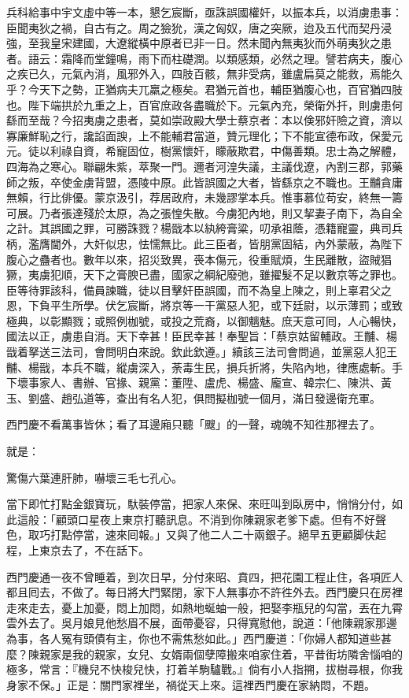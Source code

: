 兵科給事中宇文虛中等一本，懇乞宸斷，亟誅誤國權奸，以振本兵，以消虜患事：臣聞夷狄之禍，自古有之。周之獫狁，漢之匈奴，唐之突厥，迨及五代而契丹浸強，至我皇宋建國，大遼縱橫中原者已非一日。然未聞內無夷狄而外萌夷狄之患者。語云：霜降而堂鐘鳴，雨下而柱礎潤。以類感類，必然之理。譬若病夫，腹心之疾已久，元氣內消，風邪外入，四肢百骸，無非受病，雖盧扁莫之能救，焉能久乎？{}今天下之勢，正猶病夫兀羸之極矣。君猶元首也，輔臣猶腹心也，百官猶四肢也。陛下端拱於九重之上，百官庶政各盡職於下。元氣內充，榮衛外扞，則虜患何繇而至哉？今招夷虜之患者，莫如崇政殿大學士蔡京者：本以倹邪奸險之資，濟以寡廉鮮恥之行，讒諂面諛，上不能輔君當道，贊元理化；下不能宣德布政，保愛元元。徒以利祿自資，希寵固位，樹黨懷奸，矇蔽欺君，中傷善類。忠士為之解體，四海為之寒心。聯翩朱紫，萃聚一門。邇者河湟失議，主議伐遼，內割三郡，郭藥師之叛，卒使金虜背盟，憑陵中原。此皆誤國之大者，皆繇京之不職也。王黼貪庸無賴，行比俳優。蒙京汲引，荐居政府，未幾謬掌本兵。惟事慕位苟安，終無一籌可展。乃者張達殘於太原，為之張惶失散。今虜犯內地，則又挈妻子南下，為自全之計。其誤國之罪，可勝誅戮？楊戩本以紈絝膏粱，叨承祖蔭，憑籍寵靈，典司兵柄，濫膺閫外，大奸似忠，怯懦無比。此三臣者，皆朋黨固結，內外蒙蔽，為陛下腹心之蠱者也。數年以來，招災致異，䘮本傷元，役重賦煩，生民離散，盜賊猖獗，夷虜犯順，天下之膏腴已盡，國家之綱紀廢弛，雖擢髮不足以數京等之罪也。臣等待罪該科，備員諫職，徒以目擊奸臣誤國，而不為皇上陳之，則上辜君父之恩，下負平生所學。伏乞宸斷，將京等一干黨惡人犯，或下廷尉，以示薄罰；或致極典，以彰顯戮；或照例枷號，或投之荒裔，以御魑魅。庶天意可囘，人心暢快，國法以正，虜患自消。天下幸甚！臣民幸甚！奉聖旨：「蔡京姑留輔政。王黼、楊戩着拏送三法司，會問明白來說。欽此欽遵。」續該三法司會問過，並黨惡人犯王黼、楊戩，本兵不職，縱虜深入，荼毒生民，損兵折將，失陷內地，律應處斬。手下壞事家人、書辦、官掾、親黨：董陞、盧虎、楊盛、龐宣、韓宗仁、陳洪、黃玉、劉盛、趙弘道等，查出有名人犯，俱問擬枷號一個月，滿日發邊衛充軍。

西門慶不看萬事皆休；看了耳邊廂只聽「颼」的一聲，魂魄不知徃那裡去了。

就是：

驚傷六葉連肝肺，嚇壞三毛七孔心。

當下即忙打點金銀寶玩，馱裝停當，把家人來保、來旺叫到臥房中，悄悄分付，如此這般：「顧頭口星夜上東京打聽訊息。不消到你陳親家老爹下處。但有不好聲色，取巧打點停當，速來囘報。」又與了他二人二十兩銀子。絕早五更顧脚伕起程，上東京去了，不在話下。

西門慶通一夜不曾睡着，到次日早，分付來昭、賁四，把花園工程止住，各項匠人都且囘去，不做了。每日將大門緊閉，家下人無事亦不許徃外去。西門慶只在房裡走來走去，憂上加憂，悶上加悶，如熱地蜒蚰一般，把娶李瓶兒的勾當，丟在九霄雲外去了。吳月娘見他愁眉不展，面帶憂容，只得寬慰他，說道：「他陳親家那邊為事，各人冤有頭債有主，你也不需焦愁如此。」西門慶道：「你婦人都知道些甚麼？陳親家是我的親家，女兒、女婿兩個孽障搬來咱家住着，平昔街坊隣舍惱咱的極多，常言：『機兒不快梭兒快，打着羊駒驢戰。』倘有小人指搠，拔樹尋根，你我身家不保。」{}正是：關門家裡坐，禍從天上來。這裡西門慶在家納悶，不題。

